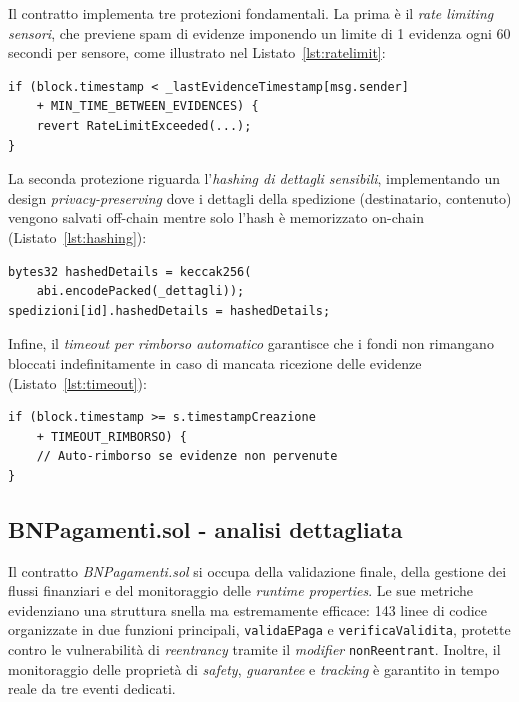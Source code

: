 Il contratto implementa tre protezioni fondamentali. La prima è il \textit{rate limiting sensori}, che previene spam di evidenze imponendo un limite di 1 evidenza ogni 60 secondi per sensore, come illustrato nel Listato~\ref{lst:ratelimit}:

\begin{lstlisting}[language=Solidity, caption={Rate limiting dei sensori}, label=lst:ratelimit]
if (block.timestamp < _lastEvidenceTimestamp[msg.sender] 
    + MIN_TIME_BETWEEN_EVIDENCES) {
    revert RateLimitExceeded(...);
}
\end{lstlisting}

La seconda protezione riguarda l'\textit{hashing di dettagli sensibili}, implementando un design \textit{privacy-preserving} dove i dettagli della spedizione (destinatario, contenuto) vengono salvati off-chain mentre solo l'hash è memorizzato on-chain (Listato~\ref{lst:hashing}):

\begin{lstlisting}[language=Solidity, caption={Hashing dei dettagli sensibili}, label=lst:hashing]
bytes32 hashedDetails = keccak256(
    abi.encodePacked(_dettagli));
spedizioni[id].hashedDetails = hashedDetails;
\end{lstlisting}

Infine, il \textit{timeout per rimborso automatico} garantisce che i fondi non rimangano bloccati indefinitamente in caso di mancata ricezione delle evidenze (Listato~\ref{lst:timeout}):

\begin{lstlisting}[language=Solidity, caption={Timeout per rimborso automatico}, label=lst:timeout]
if (block.timestamp >= s.timestampCreazione 
    + TIMEOUT_RIMBORSO) {
    // Auto-rimborso se evidenze non pervenute
}
\end{lstlisting}
\subsection{BNPagamenti.sol - analisi dettagliata}

Il contratto \textit{BNPagamenti.sol} si occupa della validazione finale, della gestione dei flussi finanziari e del monitoraggio delle \textit{runtime properties}. Le sue metriche evidenziano una struttura snella ma estremamente efficace: 143 linee di codice organizzate in due funzioni principali, \texttt{validaEPaga} e \texttt{verificaValidita}, protette contro le vulnerabilità di \textit{reentrancy} tramite il \textit{modifier} \texttt{nonReentrant}. Inoltre, il monitoraggio delle proprietà di \textit{safety}, \textit{guarantee} e \textit{tracking} è garantito in tempo reale da tre eventi dedicati.

